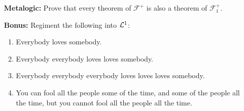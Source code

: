 \documentclass[a4paper, 11pt]{article} %
\begin{document}
\begin{enumerate}[leftmargin=1.2in]
	\item[\bf Metalogic:] Prove that every theorem of $\mathcal{F}^+$ is also a theorem of $\mathcal{F}^+_1$.
	\item[\bf Bonus:] Regiment the following into $\mathcal{L}^1$:
	      \begin{enumerate}[label=(\arabic*)]\small
		      \item Everybody loves somebody.
		      \item Everybody everybody loves loves somebody.
		      \item Everybody everybody everybody loves loves loves somebody.
		      \item You can fool all the people some of the time, and some of the people all the time, but you cannot fool all the people all the time.
	      \end{enumerate}
\end{enumerate}
\end{document}
